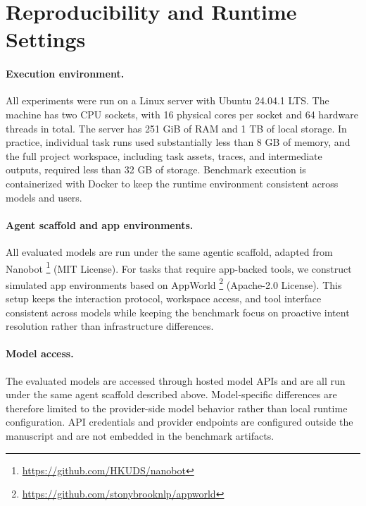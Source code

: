 
\section{Reproducibility and Runtime Settings}
\label{app:exp_settings}

\paragraph{Execution environment.}
All experiments were run on a Linux server with Ubuntu 24.04.1 LTS. The machine has two CPU sockets, with 16 physical cores per socket and 64 hardware threads in total. The server has 251 GiB of RAM and 1 TB of local storage. In practice, individual task runs used substantially less than 8 GB of memory, and the full project workspace, including task assets, traces, and intermediate outputs, required less than 32 GB of storage. Benchmark execution is containerized with Docker to keep the runtime environment consistent across models and users.

\paragraph{Agent scaffold and app environments.}
All evaluated models are run under the same agentic scaffold, adapted from Nanobot \citep{nanobot}\footnote{\url{https://github.com/HKUDS/nanobot}} (MIT License). For tasks that require app-backed tools, we construct simulated app environments based on AppWorld \citep{trivedi2024appworld}\footnote{\url{https://github.com/stonybrooknlp/appworld}} (Apache-2.0 License). This setup keeps the interaction protocol, workspace access, and tool interface consistent across models while keeping the benchmark focus on proactive intent resolution rather than infrastructure differences.

\paragraph{Model access.}
The evaluated models are accessed through hosted model APIs and are all run under the same agent scaffold described above. Model-specific differences are therefore limited to the provider-side model behavior rather than local runtime configuration. API credentials and provider endpoints are configured outside the manuscript and are not embedded in the benchmark artifacts.
